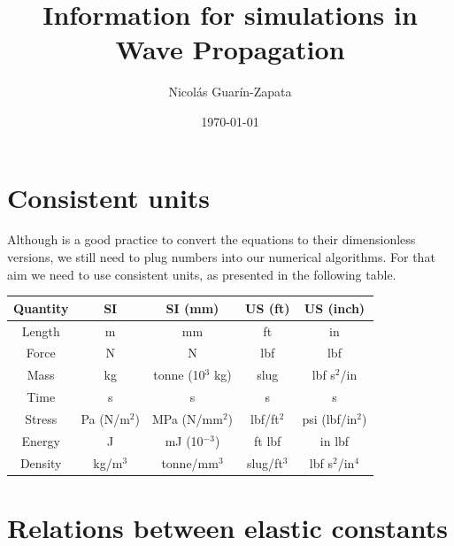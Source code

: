 \documentclass[12pt,letterpaper]{article}
\title{\textbf{Information for simulations in Wave Propagation}}
\author{Nicolás Guarín-Zapata}
\date{\today}
\begin{document}
\maketitle

\section{Consistent units}
Although is a good practice to convert the equations to their dimensionless versions, we still need to plug numbers into our numerical algorithms. For that aim we need to use consistent units, as presented in the following table.
\begin{table}[h]
\centering
\begin{tabular}{ccccc}
\hline 
\textbf{Quantity} & \textbf{SI} & \textbf{SI (mm)} & \textbf{US (ft)} & \textbf{US (inch)} \\ 
\hline 
Length & m & mm & ft & in \\ 
Force & N & N & lbf & lbf \\ 
Mass & kg & tonne (10$^3$ kg) & slug & lbf s$^2$/in \\ 
Time & s & s & s & s \\ 
Stress & Pa (N/m$^2$) & MPa (N/mm$^2$) & lbf/ft$^2$ & psi (lbf/in$^2$) \\ 
Energy & J & mJ (10$^{-3}$) & ft lbf & in lbf \\ 
Density & kg/m$^3$ & tonne/mm$^3$ & slug/ft$^3$ & lbf s$^2$/in$^4$ \\ 
\hline 
\end{tabular}
\end{table} 

\section{Relations between elastic constants}
\end{document}
